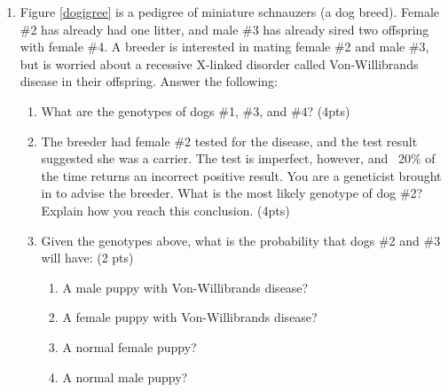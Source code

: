 \documentclass[]{article}
\begin{document}
\begin{enumerate}

\item Figure \ref{dogigree} is a pedigree of miniature schnauzers (a dog breed). Female \#2 has already had one litter, and male \#3 has already sired two offspring with female \#4. A breeder is interested in mating female \#2 and male \#3, but is worried about a recessive X-linked disorder called Von-Willibrands disease in their offspring. Answer the following:

\begin{enumerate}
\item What are the genotypes of dogs \#1, \#3, and \#4? (4pts)
\item The breeder had female \#2 tested for the disease, and the test result suggested she was a carrier. The test is imperfect, however, and ~20\% of the time returns an incorrect positive result. You are a geneticist brought in to advise the breeder. What is the most likely genotype of dog \#2? Explain how you reach this conclusion. (4pts)
\item Given the genotypes above, what is the probability that dogs \#2 and \#3 will have: (2 pts)
\begin{enumerate}
\item A male puppy with Von-Willibrands disease?
\item A female puppy with Von-Willibrands disease?
\item A normal female puppy?
\item A normal male puppy?
\end{enumerate}
\end{enumerate}


\end{enumerate}
\end{document}
